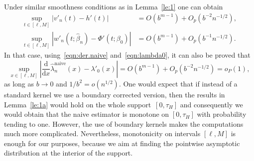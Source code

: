 \documentclass[11pt,reqno]{amsart}
\theoremstyle{definition}
\theoremstyle{plain}
\theoremstyle{remark}
\begin{document}
Under similar smoothness conditions as in Lemma~\ref{le:1} one can obtain
\begin{equation}
\label{eqn:lemma1-2a}
\begin{split}
\sup_{t\in[\ell,M]}|v'_n(t)-h'(t)|
&=
O(b^{m-1})+O_p(b^{-2}n^{-1/2}),\\
\sup_{t\in[\ell,M]}|w'_n(t;\hat{\beta}_n)-\Phi'(t;\beta_0)|
&=
O(b^{m-1})+O_p(b^{-1}n^{-1/2}).
\end{split}
\end{equation}
In that case, using~\eqref{eqn:der.naive} and~\eqref{eqn:lambda0},
it can also be proved that
\[
\sup_{x\in[\ell,M]}\left|\frac{\mathrm{d}}{\mathrm{d}x}\hat{\lambda}_n^{\mathrm{naive}}(x)-\lambda'_0(x)\right|
=
O(b^{m-1})+O_p(b^{-2}n^{-1/2})=o_P(1),
\]
as long as $b\to0$ and $1/b^2=o(n^{1/2})$.
One would expect that if instead of a standard kernel we use a boundary corrected version,
then the results in Lemma~\ref{le:1a} would hold on the whole support~$[0,\tau_H]$
and consequently we would obtain that the naive estimator is monotone on $[0,\tau_H]$ with probability tending to one.
However, the use of boundary kernels makes the computations much more complicated.
Nevertheless, monotonicity on intervals $[\ell,M]$ is enough for our purposes,
because we aim at finding the pointwise asymptotic distribution at the interior of the support.
\end{document}
